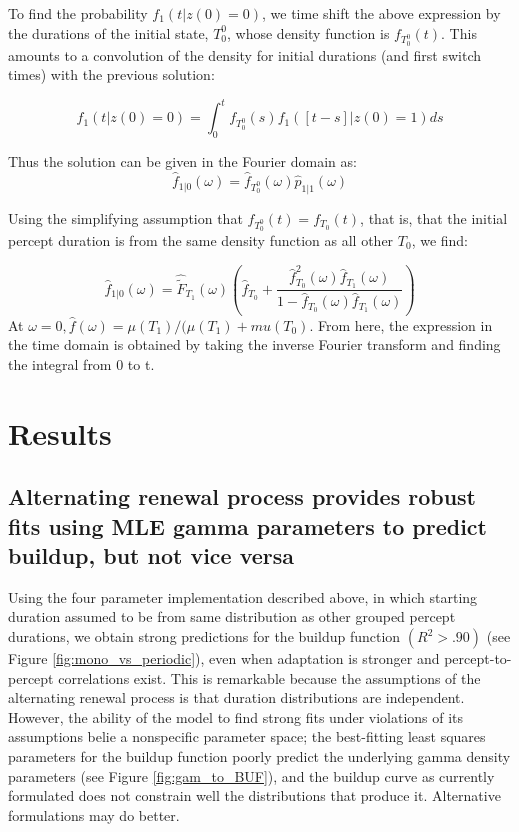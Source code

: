 \documentclass[10pt]{article}
\begin{document}
To find the probability $f_1(t|z(0)=0)$, we time shift the above expression by the durations of the initial state, $T_0^0$, whose density function is $f_{T_0^0}(t)$. This amounts to a convolution of the density for initial durations (and first switch times) with the previous solution:

\begin{equation}
f_1(t|z(0)=0) = \int_0^t f_{T_0^0}(s) f_{1}([t-s]|z(0)=1) ds
\end{equation}

Thus the solution can be given in the Fourier domain as:
\begin{equation}
\hat{f}_{1|0}(\omega) = \hat{f}_{T_0^0}(\omega) \hat{p}_{1|1} (\omega)
\end{equation}

Using the simplifying assumption that ${f}_{T_0^0}(t) = {f}_{T_0}(t)$, that is, that the initial percept duration is from the same density function as all other $T_0$, we find:
 
\begin{equation}
\hat{f}_{1|0}(\omega) = \hat{\tilde{F}}_{T_1}(\omega)
\left( \hat{f}_{T_0} + \frac{\hat{f}_{T_0}^2(\omega)\hat{f}_{T_1}(\omega)}{1-\hat{f}_{T_0}(\omega)\hat{f}_{T_1}(\omega)}\right)
\end{equation}
At $\omega = 0, \hat{f}(\omega) = \mu(T_1) / (\mu(T_1) + mu(T_0)$. From here, the expression in the time domain is obtained by taking the inverse Fourier transform and finding the integral from 0 to t.  

\section*{Results}
 
\subsection*{Alternating renewal process provides robust fits using MLE gamma parameters to predict buildup, but not vice versa}
Using the four parameter implementation described above, in which starting duration assumed to be from same distribution as other grouped percept durations, we obtain strong predictions for the buildup function $(R^2 > .90)$ (see Figure \ref{fig:mono_vs_periodic}), even when adaptation is stronger and percept-to-percept correlations exist. This is remarkable because the assumptions of the alternating renewal process is that duration distributions are independent. However, the ability of the model to find strong fits under violations of its assumptions belie a nonspecific parameter space; the best-fitting least squares parameters for the buildup function poorly predict the underlying gamma density parameters (see Figure \ref{fig:gam_to_BUF}), and the buildup curve as currently formulated does not constrain well the distributions that produce it. Alternative formulations may do better.
\end{document}
